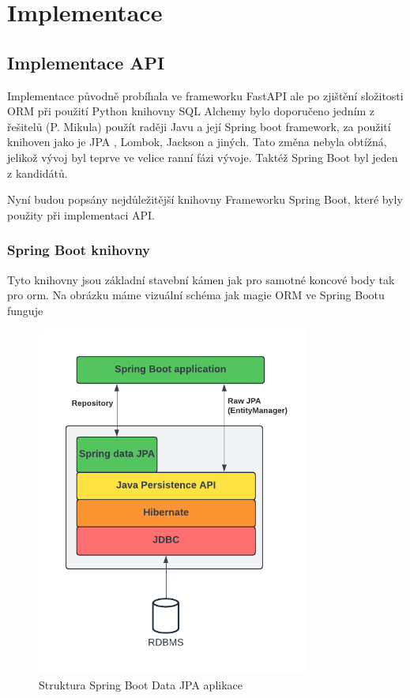 \chapter{Implementace}

\section{Implementace API}
Implementace původně probíhala ve frameworku FastAPI  ale po zjištění složitosti ORM při použití Python knihovny SQL Alchemy bylo doporučeno jedním z řešitelů (P. Mikula)
použít raději Javu a její Spring boot framework, za použití knihoven jako je JPA , Lombok, Jackson a jiných. Tato změna nebyla obtížná, jelikož vývoj byl teprve ve velice ranní fázi vývoje. Taktéž Spring Boot byl jeden z kandidátů.

Nyní budou popsány nejdůležitější knihovny Frameworku Spring Boot, které byly použity při implementaci API.


\subsection{Spring Boot knihovny}\label{sec:impl:spring} 

Tyto knihovny jsou základní stavební kámen jak pro samotné koncové body tak pro \gls{orm}. Na obrázku  máme vizuální schéma jak magie ORM ve Spring Bootu funguje

\begin{figure}[ht!]
    \centering
    \includegraphics[width=0.8\textwidth]{figures/impl/API Implementation - JPA.pdf}
    \caption{Struktura Spring Boot Data JPA aplikace}
    \label{fig:JPA}
\end{figure}

